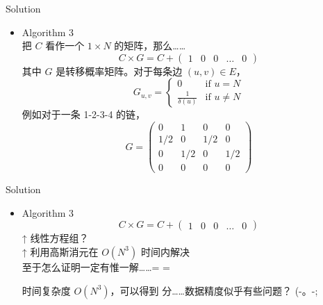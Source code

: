 \documentclass[UTF8]{beamer}
\begin{document}
\begin{frame}{Solution}
\begin{itemize}
    \item Algorithm 3 \\
        把 $C$ 看作一个 $1 \times N$ 的矩阵，那么……
        $$
            C \times G = C + \begin{pmatrix}1 & 0 & 0 & \dots & 0\end{pmatrix}
        $$
        其中 $G$ 是转移概率矩阵。对于每条边 $(u, v) \in E$，
        \begin{equation*}
            G_{u, v} =
            \begin{cases}
                0   &\mbox{if $u = N$} \\
                \frac{1}{\delta(u)}  &\mbox{if $u \neq N$}
            \end{cases}
        \end{equation*}
        例如对于一条 1-2-3-4 的链，
        $$
            G = \begin{pmatrix} 0 & 1 & 0 & 0 \\ 1/2 & 0 & 1/2 & 0 \\ 0 & 1/2 & 0 & 1/2 \\ 0 & 0 & 0 & 0 \end{pmatrix}
        $$
\end{itemize}

\end{frame}

\begin{frame}{Solution}
\begin{itemize}
    \item Algorithm 3 \\
        $$
            C \times G = C + \begin{pmatrix}1 & 0 & 0 & \dots & 0\end{pmatrix}
        $$
        \pause ↑ 线性方程组？ \\
        \pause ↑ 利用高斯消元在 $O(N^3)$ 时间内解决 \\
        \pause 至于怎么证明一定有惟一解……= =

        时间复杂度 $O(N^3)$，可以得到
         分……数据精度似乎有些问题？ (-。-;
\end{itemize}

\end{frame}

\end{document}

